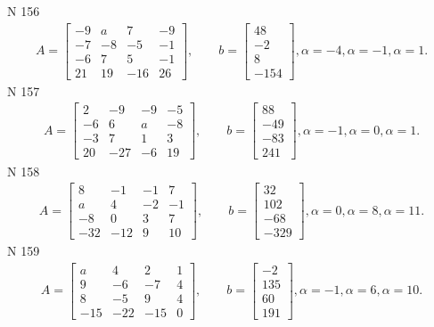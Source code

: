 \documentclass[11pt]{report}
\begin{document}
N 156
\begin{align*}
 A = \left[\begin{matrix}-9 & a & 7 & -9\\-7 & -8 & -5 & -1\\-6 & 7 & 5 & -1\\21 & 19 & -16 & 26\end{matrix}\right],
    \qquad b = \left[\begin{matrix}48\\-2\\8\\-154\end{matrix}\right], \alpha = -4, \alpha = -1, \alpha = 1. 
 \end{align*}
N 157
\begin{align*}
 A = \left[\begin{matrix}2 & -9 & -9 & -5\\-6 & 6 & a & -8\\-3 & 7 & 1 & 3\\20 & -27 & -6 & 19\end{matrix}\right],
    \qquad b = \left[\begin{matrix}88\\-49\\-83\\241\end{matrix}\right], \alpha = -1, \alpha = 0, \alpha = 1. 
 \end{align*}
N 158
\begin{align*}
 A = \left[\begin{matrix}8 & -1 & -1 & 7\\a & 4 & -2 & -1\\-8 & 0 & 3 & 7\\-32 & -12 & 9 & 10\end{matrix}\right],
    \qquad b = \left[\begin{matrix}32\\102\\-68\\-329\end{matrix}\right], \alpha = 0, \alpha = 8, \alpha = 11. 
 \end{align*}
N 159
\begin{align*}
 A = \left[\begin{matrix}a & 4 & 2 & 1\\9 & -6 & -7 & 4\\8 & -5 & 9 & 4\\-15 & -22 & -15 & 0\end{matrix}\right],
    \qquad b = \left[\begin{matrix}-2\\135\\60\\191\end{matrix}\right], \alpha = -1, \alpha = 6, \alpha = 10. 
 \end{align*}
\end{document}
